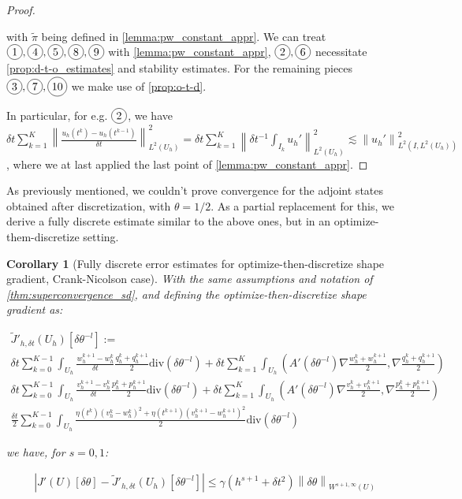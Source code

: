 \documentclass[english,a4paper,9pt,oneside]{scrbook}	%
\theoremstyle{break}
\newtheorem{cor}[equation]{Corollary}
\newenvironment{mproof}[1][\proofname]{%
  \begin{proof}[#1]$ $\par\nobreak\ignorespaces
}{%
  \end{proof}
}
\renewcommand*{\proofname}{Proof}
\theoremstyle{remark}
\newcommand{\ds}{\displaystyle}
\newcommand{\norm}[1]{\left\lVert#1\right\rVert}
\newcommand{\te}{\theta}
\newcommand{\dive}{\text{div}}
\newcommand*\circled[1]{\tikz[baseline=(char.base)]{
            \node[shape=circle,draw,inner sep=2pt] (char) {#1};}}
\begin{document}
\begin{mproof}
with $\tilde{\pi}$ being defined in \cref{lemma:pw_constant_appr}. We can treat $\circled{1},\circled{4},\circled{5},\circled{8},\circled{9}$ with \cref{lemma:pw_constant_appr}, $\circled{2},\circled{6}$ necessitate \cref{prop:d-t-o_estimates} and stability estimates. For the remaining pieces  $\circled{3},\circled{7},\circled{10}$ we make use of \cref{prop:o-t-d}.

In particular, for e.g. $\circled{2}$, we have $\ds\delta t \sum_{k=1}^K\norm{\frac{u_h(t^k)-u_h(t^{k-1})}{\delta t}}_{L^2(U_h)}^2 = \delta t\sum_{k=1}^K\norm{\delta t^{-1}\int_{I_k}u_h'}_{L^2(U_h)}^2\lesssim \norm{u_h'}_{L^2(I,L^2(U_h))}^2 $, where we at last applied the last point of \cref{lemma:pw_constant_appr}.

\end{mproof}

As previously mentioned, we couldn't prove convergence for the adjoint states obtained after discretization, with $\te = 1/2$. As a partial replacement for this, we derive a fully discrete estimate similar to the above ones, but in an optimize-them-discretize setting.

\begin{cor}[Fully discrete error estimates for optimize-then-discretize shape gradient, Crank-Nicolson case]
\label{cor:superconvergence_sd_fd_CN}
With the same assumptions and notation of \cref{thm:superconvergence_sd}, and defining the optimize-then-discretize shape gradient as:

\begin{align*}
\tilde{J}'_{h,\delta t} (U_h)[\delta \te^{-l}]:=\\
\delta t \sum_{k=0}^{K-1} \int_{U_h} \frac{w_h^{k+1}-w_h^{k}}{\delta t}\frac{q_h^k+q_h^{k+1}}{2} \dive(\delta \te^{-l})+\delta t \sum_{k=1}^K \int_{U_h} \left(A'(\delta \te^{-l})\nabla \frac{w_h^k+ w_h^{k+1}}{2} ,\nabla \frac{q_h^{k}+q_h^{k+1}}{2}\right )\\
\delta t \sum_{k=0}^{K-1} \int_{U_h} \frac{v_h^{k+1}-v_h^{k}}{\delta t}\frac{p_h^k+p_h^{k+1}}{2} \dive(\delta \te^{-l})+\delta t \sum_{k=1}^K \int_{U_h} \left(A'(\delta \te^{-l})\nabla \frac{v_h^k+ v_h^{k+1}}{2} ,\nabla \frac{p_h^{k}+p_h^{k+1}}{2}\right )\\
\frac{\delta t}{2} \sum_{k=0}^{K-1} \int_{U_h}\frac{\eta(t^k)(v_h^k-w_h^k)^2 + \eta(t^{k+1})(v_h^{k+1}-w_h^{k+1})^2}{2}\dive(\delta \te^{-l})
\end{align*}

we have, for $s=0,1$:

\begin{align*}
	\left |J'(U)[\delta \te] - \tilde{J}'_{h,\delta t}(U_h)[\delta \te^{-l}] \right|\leq \gamma  (h^{s+1}+ \delta t^2)\norm{\delta \te}_{W^{{s+1},\infty}(U)}
\end{align*}


\end{cor}
\end{document}
